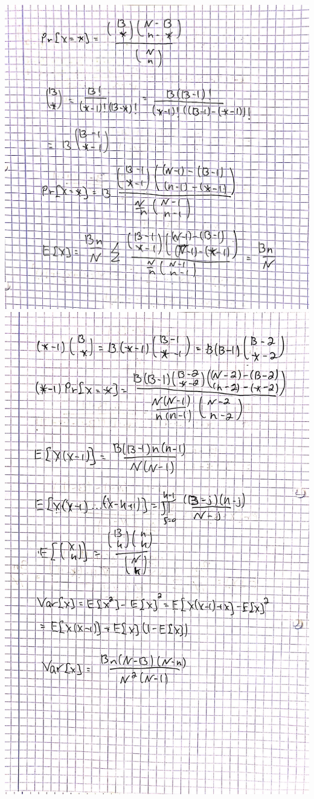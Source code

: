 \documentclass[11pt]{article}
\makeatletter
\def\maxwidth{\ifdim\Gin@nat@width>\linewidth\linewidth
    \else\Gin@nat@width\fi}
\let\Oldincludegraphics\includegraphics
\renewcommand{\includegraphics}[1]{\Oldincludegraphics[width=.8\maxwidth]{#1}}
\makeatother
\begin{document}
    \includegraphics{3-0a.JPG} \includegraphics{3-0b.JPG}
\end{document}
